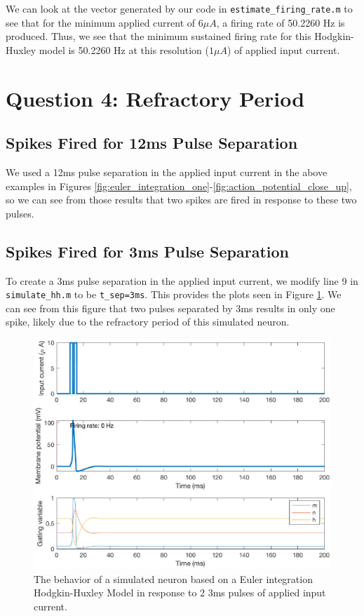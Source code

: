 \documentclass[11pt, oneside]{article}
\begin{document}
We can look at the vector generated by our code in \lstinline{estimate_firing_rate.m} to see that for the minimum applied current of $6\mu A$, a firing rate of 50.2260 Hz is produced. Thus, we see that the minimum sustained firing rate for this Hodgkin-Huxley model is 50.2260 Hz at this resolution ($1\mu A$) of applied input current.

\section{Question 4: Refractory Period}

\subsection{Spikes Fired for 12ms Pulse Separation}

We used a 12ms pulse separation in the applied input current in the above examples in Figures \ref{fig:euler_integration_one}-\ref{fig:action_potential_close_up}, so we can see from those results that two spikes are fired in response to these two pulses.

\subsection{Spikes Fired for 3ms Pulse Separation}

To create a 3ms pulse separation in the applied input current, we modify line 9 in \lstinline{simulate_hh.m} to be \lstinline{t_sep=3ms}. This provides the plots seen in Figure \ref{fig:3ms_separation}. We can see from this figure that two pulses separated by 3ms results in only one spike, likely due to the refractory period of this simulated neuron.

\begin{figure}[ht!]
\centering
\includegraphics[width=1\textwidth]{2ms_separation.eps}
\caption{The behavior of a simulated neuron based on a Euler integration Hodgkin-Huxley Model in response to 2 3ms pulses of applied input current.}
\label{fig:3ms_separation}
\end{figure}
\end{document}

